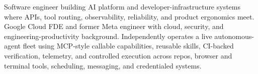 


Software engineer building AI platform and developer-infrastructure systems where APIs, tool routing, observability, reliability, and product ergonomics meet. Google Cloud FDE and former Meta engineer with cloud, security, and engineering-productivity background. Independently operates a live autonomous-agent fleet using MCP-style callable capabilities, reusable skills, CI-backed verification, telemetry, and controlled execution across repos, browser and terminal tools, scheduling, messaging, and credentialed systems.







